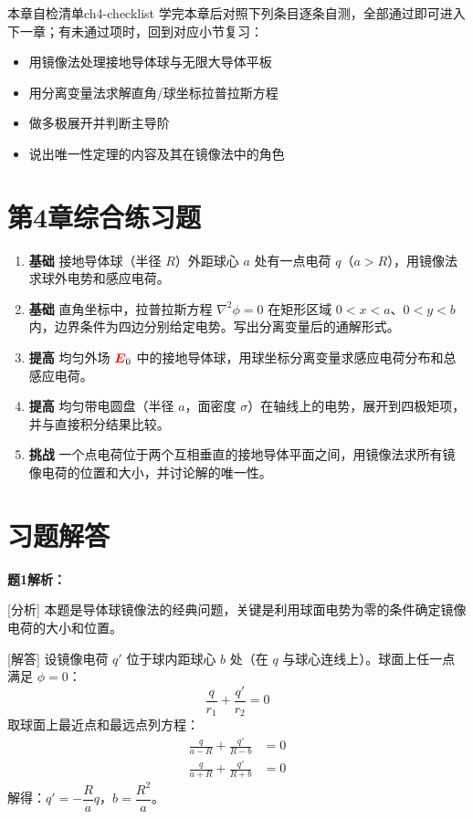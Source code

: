 \documentclass[11pt,a4paper,openany,oneside]{book}
\newcommand{\vecE}{\textcolor{red}{\vect{E}}}
\newcommand{\vect}[1]{\bm{#1}}
\newcommand{\lap}{\nabla^2}
\begin{document}
\begin{tip}{本章自检清单}{ch4-checklist}
学完本章后对照下列条目逐条自测，全部通过即可进入下一章；有未通过项时，回到对应小节复习：
\begin{itemize}[label=$\square$, nosep]
\item 用镜像法处理接地导体球与无限大导体平板
\item 用分离变量法求解直角/球坐标拉普拉斯方程
\item 做多极展开并判断主导阶
\item 说出唯一性定理的内容及其在镜像法中的角色
\end{itemize}
\end{tip}

\section*{第4章综合练习题}
\begin{enumerate}[label=\textbf{\arabic*.}]
\item \textbf{基础} 接地导体球（半径 $R$）外距球心 $a$ 处有一点电荷 $q$（$a>R$），用镜像法求球外电势和感应电荷。
\item \textbf{基础} 直角坐标中，拉普拉斯方程 $\lap\phi=0$ 在矩形区域 $0<x<a$、$0<y<b$ 内，边界条件为四边分别给定电势。写出分离变量后的通解形式。
\item \textbf{提高} 均匀外场 $\vecE_0$ 中的接地导体球，用球坐标分离变量求感应电荷分布和总感应电荷。
\item \textbf{提高} 均匀带电圆盘（半径 $a$，面密度 $\sigma$）在轴线上的电势，展开到四极矩项，并与直接积分结果比较。
\item \textbf{挑战} 一个点电荷位于两个互相垂直的接地导体平面之间，用镜像法求所有镜像电荷的位置和大小，并讨论解的唯一性。
\end{enumerate}
\newpage
\section*{习题解答}

\textbf{题1解析：}

[分析] 本题是导体球镜像法的经典问题，关键是利用球面电势为零的条件确定镜像电荷的大小和位置。

[解答] 设镜像电荷 $q'$ 位于球内距球心 $b$ 处（在 $q$ 与球心连线上）。球面上任一点满足 $\phi = 0$：
\[
\frac{q}{r_1} + \frac{q'}{r_2} = 0
\]
取球面上最近点和最远点列方程：
\begin{align*}
\frac{q}{a-R} + \frac{q'}{R-b} &= 0 \\
\frac{q}{a+R} + \frac{q'}{R+b} &= 0
\end{align*}
解得：$q' = -\dfrac{R}{a}q$，$b = \dfrac{R^2}{a}$。
\end{document}
